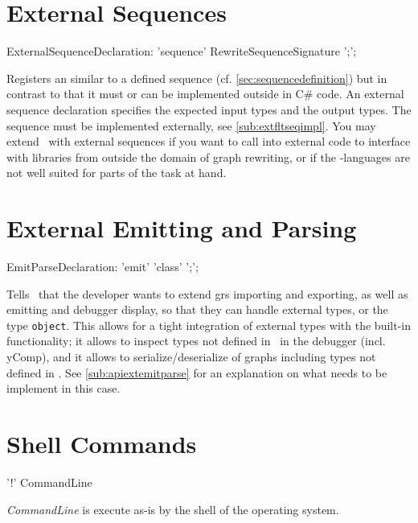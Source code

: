 \section{External Sequences}\label{sub:extseq}
\begin{rail}
  ExternalSequenceDeclaration: 
    'sequence' RewriteSequenceSignature ';';
\end{rail}
Registers an  similar to a defined sequence (cf. \ref{sec:sequencedefinition}) but in contrast to that it must or can be implemented outside in C\# code.
An external sequence declaration specifies the expected input types and the output types. The sequence must be implemented externally, see \ref{sub:extfltseqimpl}.
You may extend \GrG~with external sequences if you want to call into external code to interface with libraries from outside the domain of graph rewriting, or if the \GrG-languages are not well suited for parts of the task at hand.

\section{External Emitting and Parsing}\label{sub:extemitparse}
\begin{rail}
  EmitParseDeclaration: 'emit' 'class' ';';
\end{rail}
Tells \GrG~that the developer wants to extend grs importing and exporting, as well as emitting and debugger display, so that they can handle external types, or the type \texttt{object}.
This allows for a tight integration of external types with the built-in functionality;
it allows to inspect types not defined in \GrG~in the debugger (incl. yComp),
and it allows to serialize/deserialize of graphs including types not defined in \GrG.
See \ref{sub:apiextemitparse} for an explanation on what needs to be implement in this case.

\section{Shell Commands}

\begin{rail}
  '!' CommandLine
\end{rail}
\emph{CommandLine} is execute as-is by the shell of the operating system.

